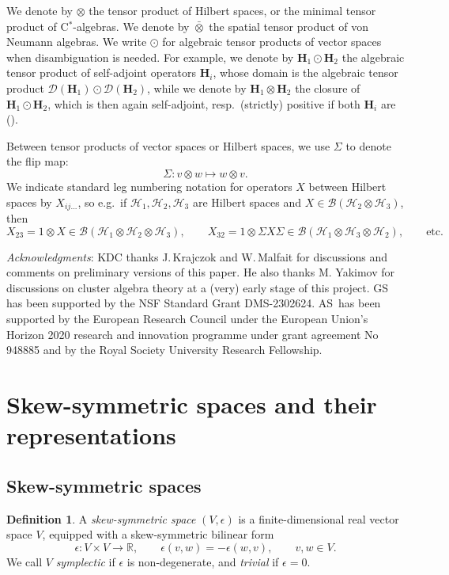 \documentclass[11pt, reqno]{amsart}
\theoremstyle{definition}
\newtheorem{defn}[theorem]{Definition}
\numberwithin{equation}{section}
\def\msD{\mathscr D}
\def\Hc{\mathcal H}
\def\R{\mathbb R}
\newcommand{\Bc}{\mathcal{B}}
\newcommand{\Hb}{\mathbf{H}}
\newcommand{\vNTens}{\bar{\otimes}}
\begin{document}
We denote by $\otimes$ the tensor product of Hilbert spaces, or the minimal tensor product of C$^*$-algebras. We denote by $\vNTens$ the spatial tensor product of von Neumann algebras. We  write $\odot$ for algebraic tensor products of vector spaces when disambiguation is needed. For example, we denote by $\Hb_1\odot \Hb_2$ the algebraic tensor product of self-adjoint operators $\Hb_i$, whose domain is the algebraic tensor product $\msD(\Hb_1)\odot \msD(\Hb_2)$, while we denote by $\Hb_1\otimes \Hb_2$ the closure of $\Hb_1\odot \Hb_2$, which is then again self-adjoint, resp.\ (strictly) positive if both $\Hb_i$ are (\cite[Section VIII.10]{RS81}).

Between tensor products of vector spaces or Hilbert spaces, we use $\Sigma$ to denote the flip map:
\[
\Sigma\colon v\otimes w \mapsto w\otimes v.
\]
We indicate standard leg numbering notation for operators $X$ between Hilbert spaces by $X_{ij...}$, so e.g.\ if $\Hc_1,\Hc_2,\Hc_3$ are Hilbert spaces and $X\in \Bc(\Hc_2\otimes\Hc_3)$, then 
\[
X_{23} = 1\otimes X \in \Bc(\Hc_1\otimes \Hc_2\otimes \Hc_3),\qquad X_{32} = 1\otimes \Sigma X \Sigma \in \Bc(\Hc_1\otimes \Hc_3\otimes \Hc_2),\qquad \textrm{etc.} 
\]


\emph{Acknowledgments}: KDC thanks J.\,Krajczok and W.\,Malfait for discussions and comments on preliminary versions of this paper. He also thanks M. Yakimov for discussions on cluster algebra theory at a (very) early stage of this project. GS has been supported by the NSF Standard Grant DMS-2302624. AS\ has been supported by the European Research Council under the European Union’s Horizon 2020 research and innovation programme under grant agreement No 948885 and by the Royal Society University Research
Fellowship.

\section{Skew-symmetric spaces and their representations}

\subsection{Skew-symmetric spaces}

\begin{defn}
A \emph{skew-symmetric space} $(V,\epsilon)$ is a finite-dimensional real vector space $V$, equipped with a skew-symmetric bilinear form 
\[
\epsilon\colon V\times V \rightarrow \R,\qquad \epsilon(v,w) = -\epsilon(w,v),\qquad v,w\in V.
\] 
We call $V$ \emph{symplectic} if $\epsilon$ is non-degenerate, and \emph{trivial} if $\epsilon=0$.
\end{defn}
\end{document}
